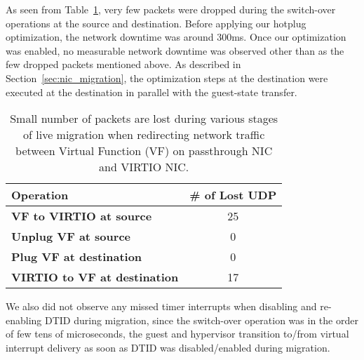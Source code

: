 As seen from Table~\ref{tab:udp_packet_lost}, very few packets
were dropped during the switch-over operations at the source and destination.
Before applying our hotplug optimization, the network downtime was
around 300ms. Once our optimization was enabled, no measurable network
downtime was observed other than as the few  dropped packets mentioned above. 
As described in Section~\ref{sec:nic_migration}, the 
optimization steps at the destination were executed at the destination 
in parallel with the guest-state transfer. 
\begin{table}[t]
\begin{center}
\begin{tabular}{|l|c|}
\hline
\textbf{Operation}    & \multicolumn{1}{l|}{\textbf{\# of Lost UDP}} \\ \hline
\textbf{VF to VIRTIO at source} & 25                                           \\ \hline
\textbf{Unplug VF at source}    & 0                                            \\ \hline
\textbf{Plug VF at destination}      & 0                                            \\ \hline
\textbf{VIRTIO to VF at destination} & 17                                           \\ \hline
\end{tabular}
\end{center}
\vspace{-0.1in}
\caption{Small number of packets are lost during various stages of 
live migration when redirecting 
network traffic between Virtual Function (VF) on passthrough NIC and VIRTIO NIC.
}
\vspace{-0.05in}
\label{tab:udp_packet_lost}
\end{table}

We also did not observe any missed timer interrupts when
disabling and re-enabling DTID during migration, since the
switch-over operation was in the order of few tens of
microseconds, the guest and hypervisor transition to/from
virtual interrupt delivery as soon as DTID was
disabled/enabled during migration.




